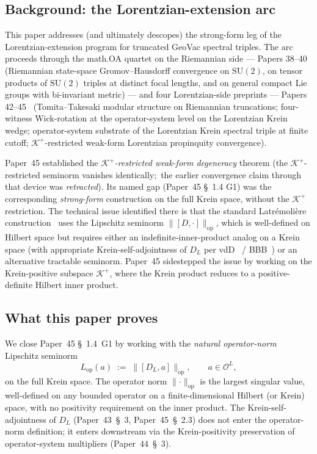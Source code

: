 \documentclass[11pt,a4paper]{article}
\theoremstyle{plain}
\theoremstyle{definition}
\newcommand{\Krein}{\mathcal{K}}
\newcommand{\Op}{\mathcal{O}}
\newcommand{\opnorm}[1]{\lVert #1 \rVert_{\mathrm{op}}}
\newcommand{\SU}{\mathrm{SU}}
\newcommand{\DL}{D_{L}}
\newcommand{\Lop}{L_{\mathrm{op}}}
\newcommand{\Kplus}{\Krein^{+}}
\begin{document}
\subsection{Background: the Lorentzian-extension arc}\label{sec:background}

This paper addresses (and ultimately descopes) the strong-form leg of
the Lorentzian-extension program for truncated GeoVac spectral triples. The arc proceeds through
the math.OA quartet on the Riemannian side --- Papers
38--40~\cite{paper38,paper39,paper40_unified} (Riemannian state-space
Gromov--Hausdorff convergence on $\SU(2)$, on tensor products of $\SU(2)$ triples at
distinct focal lengths, and on general compact Lie groups with
bi-invariant metric) --- and four Lorentzian-side preprints --- Papers
42--45~\cite{paper42,paper43,paper44,paper45} (Tomita--Takesaki modular
structure on Riemannian truncations; four-witness Wick-rotation at the
operator-system level on the Lorentzian Krein wedge; operator-system
substrate of the Lorentzian Krein spectral triple at finite cutoff;
$\Kplus$-restricted weak-form Lorentzian propinquity convergence).

Paper~45 established the \emph{$\Kplus$-restricted weak-form
degeneracy} theorem (the $\Kplus$-restricted seminorm vanishes
identically;\ the earlier convergence claim through that device was
\emph{retracted}). Its named gap (Paper~45
\S~1.4 G1) was the corresponding \emph{strong-form} construction on the
full Krein space, without the $\Kplus$ restriction. The technical issue
identified there is that the standard Latr\'emoli\`ere
construction~\cite{latremoliere_metric_st_2017} uses the Lipschitz
seminorm $\opnorm{[D, \cdot]}$, which is well-defined on Hilbert space
but requires either an indefinite-inner-product analog on a Krein
space (with appropriate Krein-self-adjointness of $\DL$ per
vdD~\cite{vandungen2016} / BBB~\cite{bizi_brouder_besnard2018}) or an
alternative tractable seminorm. Paper~45 sidestepped the issue by
working on the Krein-positive subspace $\Kplus$, where the Krein
product reduces to a positive-definite Hilbert inner product.

\subsection{What this paper proves}\label{sec:what_this_paper_proves}

We close Paper~45 \S~1.4~G1 by working with the
\emph{natural operator-norm} Lipschitz seminorm
\begin{equation}\label{eq:Lop_def}
   \Lop(a) \;:=\; \opnorm{[\DL, a]}, \qquad a \in \Op^{L},
\end{equation}
on the full Krein space. The operator norm $\opnorm{\cdot}$ is the
largest singular value, well-defined on any bounded operator on a
finite-dimensional Hilbert (or Krein) space, with no positivity
requirement on the inner product. The Krein-self-adjointness of $\DL$
(Paper~43~\S~3, Paper~45~\S~2.3) does not enter the operator-norm
definition; it enters downstream via the Krein-positivity preservation
of operator-system multipliers (Paper~44~\S~3).
\end{document}
